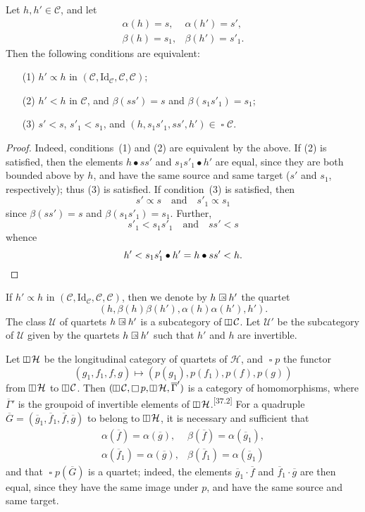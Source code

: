 \documentclass[a4paper,fleqn]{article}
\makeatletter
\theoremstyle{plain}
\newenvironment{proposition}[1]
  {\renewcommand\theinnerproposition{#1}\innerproposition}
  {\endinnerproposition}
\theoremstyle{definition}
\def\blfootnote{\xdef\@thefnmark{}\@footnotetext}
\newcommand{\comm}[2]{{\normalfont\textsuperscript{[#1]}}\blfootnote{\label{footnote:#1}\textbf{[#1]} #2}}
\newcommand{\textand}{\quad\text{and}\quad}
\newcommand{\CC}{\mathcal{C}}
\newcommand{\HH}{\mathcal{H}}
\newcommand{\UU}{\mathcal{U}}
\newcommand{\subs}{\mathrel{\propto}}
\newcommand{\Id}{\mathrm{Id}}
\newcommand{\vsqbox}{{\rotatebox{90}{$\boxminus$}}}
\DeclareMathOperator{\sq}{\square}
\DeclareMathOperator{\vsq}{\raisebox{-.1em}{$\vsqbox$}}
\newcommand{\sqsubs}{\mathrel{\mathrlap{\square}\raisebox{.17em}{\scaleobj{0.65}{\,\,\propto}}}}
\newcommand{\smallbullet}{\bullet}
\makeatother
\begin{document}
\begin{proposition}{8}
\label{proposition:i-8}
  Let $h,h'\in\CC$, and let
  \[
    \begin{array}{ll}
      \alpha(h)
      = s,
      &\alpha(h')
      = s',
    \\\beta(h)
      = s_1,
      &\beta(h')
      = s'_1.
    \end{array}
  \]
  Then the following conditions are equivalent:
  \begin{enumerate}
    \item[\normalfont(1)]
      $h'\subs h$ in $(\CC,\Id_\CC,\CC,\CC)$;
    \item[\normalfont(2)]
      $h'<h$ in $\CC$, and $\beta(ss')=s$ and $\beta(s_1s'_1)=s_1$;
    \item[\normalfont(3)]
      $s'<s$, $s'_1<s_1$, and $(h,s_1s'_1,ss',h')\in\sq\CC$.
  \end{enumerate}
\end{proposition}

\begin{proof}
  Indeed, conditions~(1) and (2) are equivalent by the above.
  If (2) is satisfied, then the elements $h\smallbullet ss'$ and $s_1s'_1\smallbullet h'$ are equal, since they are both bounded above by $h$, and have the same source and same target ($s'$ and $s_1$, respectively);
  thus (3) is satisfied.
  If condition~(3) is satisfied, then
  \[
    s'\subs s
    \textand
    s'_1\subs s_1
  \]
  since $\beta(ss')=s$ and $\beta(s_1s'_1)=s_1$.
  Further,
  \[
    s'_1<s_1s'_1
    \textand
    ss'<s
  \]
  whence
  \[
    h'
    < s_1s'_1\smallbullet h'
    = h\smallbullet ss'
    < h.
    \qedhere
  \]
\end{proof}

If $h'\subs h$ in $(\CC,\Id_\CC,\CC,\CC)$, then we denote by $h\sqsubs h'$ the quartet
\[
  (h,\beta(h)\beta(h'),\alpha(h)\alpha(h'),h').
\]
The class $\UU$ of quartets $h\sqsubs h'$ is a subcategory of $\vsq\CC$.
Let $\UU'$ be the subcategory of $\UU$ given by the quartets $h\sqsubs h'$ such that $h'$ and $h$ are invertible.

Let $\vsq\HH$ be the longitudinal category of quartets of $\HH$, and $\sq p$ the functor
\[
  (g_1,f_1,f,g)
  \longmapsto (p(g_1),p(f_1),p(f),p(g))
\]
from $\vsq\HH$ to $\vsq\CC$.
Then $(\vsq\CC,\sq p,\vsq\HH,\overline{\Gamma}')$ is a category of homomorphisms, where $\overline{\Gamma}'$ is the groupoid of invertible elements of $\vsq\HH$.\comm{37.2}{This is easy to prove (cf. \cite[Chapter~II]{coll122}).}
For a quadruple $\overline{G}=(\overline{g}_1,\overline{f}_1,\overline{f},\overline{g})$ to belong to $\vsq\HH$, it is necessary and sufficient that
\[
  \begin{array}{ll}
    \alpha(\overline{f})=\alpha(\overline{g}),
    & \beta(\overline{f})=\alpha(\overline{g}_1),
  \\\alpha(\overline{f}_1)=\alpha(\overline{g}),
    & \beta(\overline{f}_1)=\alpha(\overline{g}_1)
  \end{array}
\]
and that $\sq p(\overline{G})$ is a quartet;
indeed, the elements $\overline{g}_1\cdot\overline{f}$ and $\overline{f}_1\cdot\overline{g}$ are then equal, since they have the same image under $p$, and have the same source and same target.
\end{document}
